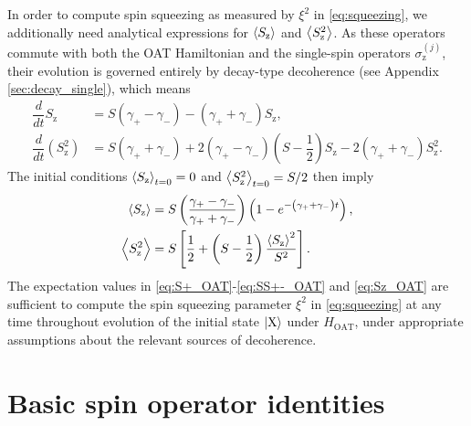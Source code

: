 \documentclass[pra,reprint,longbibliography]{revtex4-1}
\renewcommand{\t}{\text} %
\newcommand{\f}[2]{\dfrac{#1}{#2}} %
\newcommand{\p}[1]{\left(#1\right)} %
\renewcommand{\sp}[1]{\left[#1\right]} %
\newcommand{\bk}{\Braket} %
\newcommand{\z}{\text{z}}
\newcommand{\X}{\text{X}}
\newcommand{\1}{\mathds{1}}
\begin{document}
In order to compute spin squeezing as measured by $\xi^2$ in
\eqref{eq:squeezing}, we additionally need analytical expressions for
$\bk{S_\z}$ and $\bk{S_\z^2}$.  As these operators commute with both
the OAT Hamiltonian and the single-spin operators $\sigma_\z^{(j)}$,
their evolution is governed entirely by decay-type decoherence (see
Appendix \ref{sec:decay_single}), which means
\begin{align}
  \f{d}{dt} S_\z
  &= S\p{\gamma_+-\gamma_-} - \p{\gamma_++\gamma_-} S_\z,
  \\
  \f{d}{dt}\p{S_\z^2}
  &= S\p{\gamma_++\gamma_-} + 2\p{\gamma_+-\gamma_-}\p{S-\f12} S_\z
  - 2 \p{\gamma_++\gamma_-} S_\z^2.
\end{align}
The initial conditions $\bk{S_\z}_{t=0}=0$ and $\bk{S_\z^2}_{t=0}=S/2$
then imply
\begin{align}
  \bk{S_\z}
  &= S\p{\f{\gamma_+-\gamma_-}{\gamma_++\gamma_-}}
  \p{1-e^{-\p{\gamma_+ + \gamma_-} t}}, \\
  \bk{S_\z^2} &= S \sp{\f12 + \p{S-\f12} \f{\bk{S_\z}^2}{S^2}}.
  \label{eq:Sz_OAT}
\end{align}
The expectation values in \eqref{eq:S+_OAT}-\eqref{eq:SS+-_OAT} and
\eqref{eq:Sz_OAT} are sufficient to compute the spin squeezing
parameter $\xi^2$ in \eqref{eq:squeezing} at any time throughout
evolution of the initial state $\ket{\X}$ under $H_{\t{OAT}}$, under
appropriate assumptions about the relevant sources of decoherence.


\section{Basic spin operator identities}
\label{sec:identities}
\end{document}
